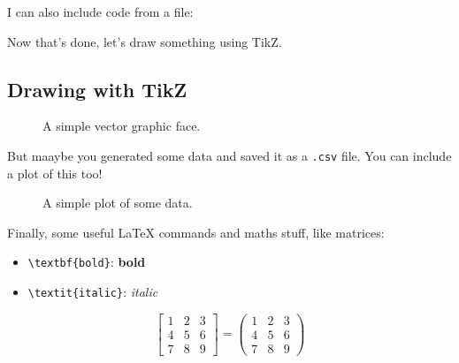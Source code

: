 \documentclass[12pt,twoside]{article}
\begin{document}
I can also include code from a file:


Now that's done, let's draw something using TikZ.

\subsection{Drawing with TikZ}

\begin{figure}[H]
    \centering
    \caption{A simple vector graphic face.}
    \label{fig:tikz_2d}
\end{figure}

But maaybe you generated some data and saved it as a \texttt{.csv} file. You can
include a plot of this too!

\begin{figure}[H]
    \centering
    \caption{A simple plot of some data.}
    \label{fig:tikz_plot}
\end{figure}

Finally, some useful LaTeX commands and maths stuff, like matrices:
\begin{itemize}
    \item \texttt{\textbackslash textbf\{bold\}}: \textbf{bold}
    \item \texttt{\textbackslash textit\{italic\}}: \textit{italic}
\end{itemize}

\begin{equation}
    \begin{bmatrix}
        1 & 2 & 3 \\
        4 & 5 & 6 \\
        7 & 8 & 9
    \end{bmatrix}=
    \begin{pmatrix}
        1 & 2 & 3 \\
        4 & 5 & 6 \\
        7 & 8 & 9
    \end{pmatrix}
\end{equation}
\end{document}
